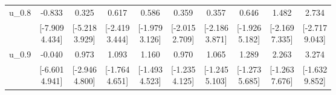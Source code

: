 {\begin{tabular}{lccccccccc}
u\_0.8 & -0.833 & 0.325 & 0.617 & 0.586 & 0.359 & 0.357 & 0.646 & 1.482 & 2.734 \\
 & \shortstack{[-7.909\\4.434]} & \shortstack{[-5.218\\3.929]} & \shortstack{[-2.419\\3.444]} & \shortstack{[-1.979\\3.126]} & \shortstack{[-2.015\\2.709]} & \shortstack{[-2.186\\3.871]} & \shortstack{[-1.926\\5.182]} & \shortstack{[-2.169\\7.335]} & \shortstack{[-2.717\\9.043]} \\[0.25em]
u\_0.9 & -0.040 & 0.973 & 1.093 & 1.160 & 0.970 & 1.065 & 1.289 & 2.263 & 3.274 \\
 & \shortstack{[-6.601\\4.941]} & \shortstack{[-2.946\\4.800]} & \shortstack{[-1.764\\4.651]} & \shortstack{[-1.493\\4.523]} & \shortstack{[-1.235\\4.125]} & \shortstack{[-1.245\\5.103]} & \shortstack{[-1.273\\5.685]} & \shortstack{[-1.263\\7.676]} & \shortstack{[-1.632\\9.852]} \\[0.25em]
\bottomrule
\end{tabular}
}
